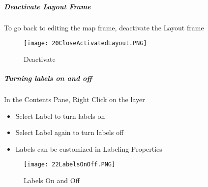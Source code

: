 \subparagraph{Deactivate Layout Frame}

To go back to editing the map frame, deactivate the Layout frame



\begin{figure}[h!]
 \centering
     \texttt{[image: 20CloseActivatedLayout.PNG]}
 \caption{Deactivate}


 \end{figure} 

\clearpage


\subparagraph{Turning labels on and off}

In the Contents Pane, Right Click on the layer

\begin{itemize}

\item Select Label to turn labels on

\item Select Label again to turn labels off

\item Labels can be customized in Labeling Properties

\end{itemize}


\begin{figure}[h!]
 \centering
     \texttt{[image: 22LabelsOnOff.PNG]}
 \caption{Labels On and Off}

 \end{figure}
 

